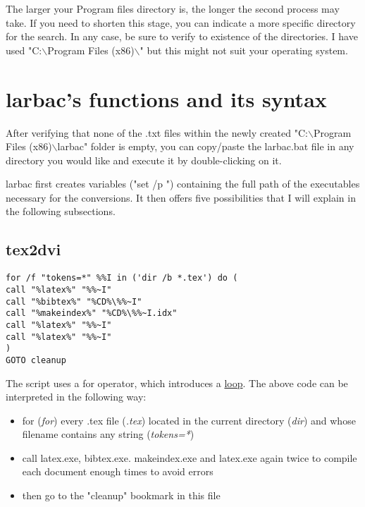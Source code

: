 \documentclass{article}
\begin{document}
The larger your Program files directory is, the longer the second process may take. If you need to shorten this stage, you can indicate a more specific directory for the search. In any case, be sure to verify to existence of the directories. I have used "C:$\backslash{}$Program Files (x86)$\backslash{}$" but this might not suit your operating system.


\section{larbac's functions and its syntax}

After verifying that none of the .txt files within the newly created "C:$\backslash{}$Program Files (x86)$\backslash{}$larbac" folder is empty, you can copy/paste the larbac.bat file in any directory you would like and execute it by double-clicking on it.

larbac first creates variables ("set /p ") containing the full path of the executables necessary for the conversions. It then offers five possibilities that I will explain in the following subsections.
\subsection{tex2dvi}

\begin{mdframed}[style=code]
\begin{lstlisting}[breaklines]
for /f "tokens=*" %%I in ('dir /b *.tex') do (
call "%latex%" "%%~I"
call "%bibtex%" "%CD%\%%~I"
call "%makeindex%" "%CD%\%%~I.idx"
call "%latex%" "%%~I"
call "%latex%" "%%~I"
)
GOTO cleanup
\end{lstlisting}
\end{mdframed}


The script uses a for operator, which introduces a \href{http://technet.microsoft.com/en-us/library/bb490909.aspx}{loop}. The above code can be interpreted in the following way:
\begin{itemize}
\item for (\textit{for}) every .tex file (\textit{.tex}) located in the current directory (\textit{dir}) and whose filename contains any string (\textit{tokens=*})
\item call latex.exe, bibtex.exe. makeindex.exe and latex.exe again twice to compile each document enough times to avoid errors
\item then go to the "cleanup" bookmark in this file
\end{itemize}
\end{document}
